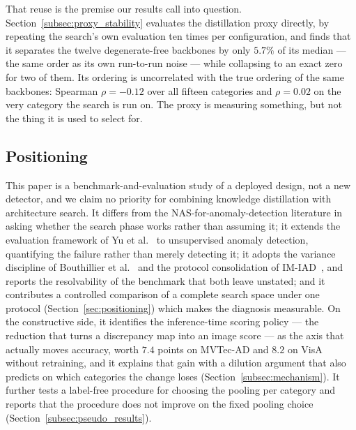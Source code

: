 That reuse is the premise our results call into question.
Section~\ref{subsec:proxy_stability} evaluates the distillation proxy directly, by
repeating the search's own evaluation ten times per configuration, and finds that
it separates the twelve degenerate-free backbones by only $5.7\%$ of its median ---
the same order as its own run-to-run noise --- while collapsing to an exact zero
for two of them. Its ordering is uncorrelated with the true ordering of the same
backbones: Spearman $\rho = -0.12$ over all fifteen categories and $\rho = 0.02$
on the very category the search is run on. The proxy is measuring something, but
not the thing it is used to select for.

\subsection{Positioning}
\label{subsec:related_summary}

This paper is a benchmark-and-evaluation study of a deployed design, not a new
detector, and we claim no priority for combining knowledge distillation with
architecture search. It differs from the NAS-for-anomaly-detection literature in
asking whether the search phase works rather than assuming it; it extends the
evaluation framework of Yu et al.~\cite{yu2020evaluating} to unsupervised anomaly
detection, quantifying the failure rather than merely detecting it; it adopts the
variance discipline of Bouthillier et al.~\cite{bouthillier2021accounting} and the
protocol consolidation of IM-IAD~\cite{xie2024imiad}, and reports the
resolvability of the benchmark that both leave unstated; and it contributes a
controlled comparison of a complete search space under one protocol
(Section~\ref{sec:positioning}) which makes the diagnosis measurable. On the
constructive side, it identifies the inference-time scoring policy --- the
reduction that turns a discrepancy map into an image score --- as the axis that
actually moves accuracy, worth $7.4$ points on MVTec-AD and $8.2$ on VisA
without retraining, and it explains that gain with a dilution argument that also
predicts on which categories the change loses (Section~\ref{subsec:mechanism}). It
further tests a label-free procedure for choosing the pooling per category and
reports that the procedure does not improve on the fixed pooling choice
(Section~\ref{subsec:pseudo_results}).
